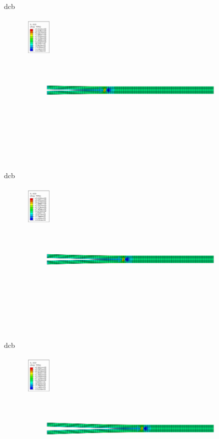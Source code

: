 \documentclass[10pt]{beamer}
\begin{document}
	\begin{frame}{dcb}
		\begin{figure}
			\centering
			\includegraphics[width=0.9\linewidth]{../Figures/dcb6}
		\end{figure}
	\end{frame}

	\begin{frame}{dcb}
		\begin{figure}
			\centering
			\includegraphics[width=0.9\linewidth]{../Figures/dcb7}
		\end{figure}
	\end{frame}

	\begin{frame}{dcb}
		\begin{figure}
			\centering
			\includegraphics[width=0.9\linewidth]{../Figures/dcb8}
		\end{figure}
	\end{frame}
\end{document}
